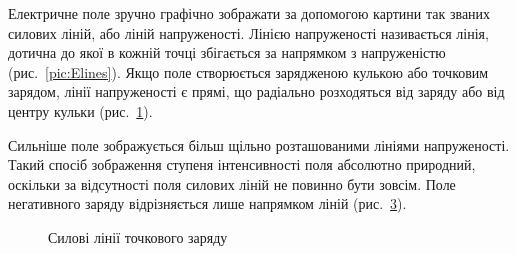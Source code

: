 \documentclass{LabWork}
\begin{document}
Електричне поле зручно графічно зображати за допомогою картини так званих силових ліній, або ліній
напруженості. Лінією напруженості називається лінія, дотична до якої в кожній точці збігається за напрямком з напруженістю (рис.~\ref{pic:Elines}). Якщо поле створюється зарядженою кулькою або точковим зарядом, лінії напруженості є прямі, що радіально розходяться від заряду або від центру кульки (рис.~\ref{fig:q1}). 

Сильніше поле зображується більш щільно розташованими лініями напруженості. Такий спосіб зображення ступеня інтенсивності поля абсолютно природний, оскільки за відсутності поля силових ліній не повинно бути зовсім. Поле негативного заряду відрізняється лише напрямком ліній (рис.~\ref{fig:qmin}). 

\begin{figure}[h!]
  \centering
   \def\R{2.5} 
  \begin{subfigure}[t]{0.3\linewidth}
    \centering
    \caption{}
    \label{fig:q1}
  \end{subfigure}
  \begin{subfigure}[t]{0.3\linewidth}
    \centering
    \caption{}
    \label{fig:q2}
  \end{subfigure}
  \label{fig:myfig}
  \begin{subfigure}[t]{0.3\linewidth}
    \centering
    \caption{}
    \label{fig:qmin}
  \end{subfigure}
  \caption{Силові лінії точкового заряду}
  \label{fig:q}
\end{figure}
\end{document}
